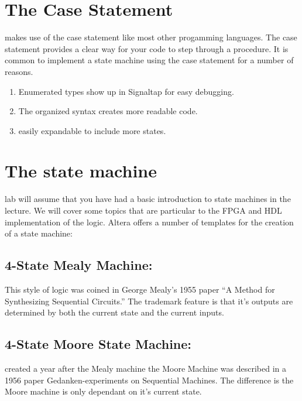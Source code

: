   \section{The Case Statement}
     makes use of the case statement like most other progamming languages. The case statement provides a clear way for your code to step through a procedure. It is common to implement a state machine using the case statement for a number of reasons.
    \begin{enumerate}
      \item Enumerated types show up in Signaltap for easy debugging.
      \item The organized syntax creates more readable code.
      \item easily expandable to include more states.
    \end{enumerate}

  \section{The state machine}
     lab will assume that you have had a basic introduction to state machines in the lecture. We will cover some topics that are particular to the FPGA and HDL implementation of the logic. Altera offers a number of templates for the creation of a state machine\cite{Altera:QuartusHandbook}:
      
      \subsection{4-State Mealy Machine:} This style of logic was coined in George Mealy's 1955 paper “A Method for Synthesizing Sequential Circuits.” The trademark feature is that it's outputs are determined by both the current state and the current inputs. \cite{Wikipedia:MealyMachine}
      
      \subsection{4-State Moore State Machine:} created a year after the Mealy machine the Moore Machine was described in a 1956 paper Gedanken-experiments on Sequential Machines. The difference is the Moore machine is only dependant on it's current state. \cite{Wikipedia:MooreMachine}
      
